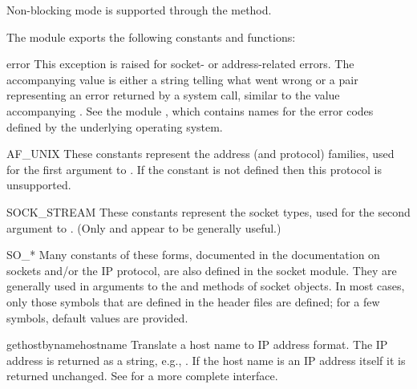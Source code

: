 Non-blocking mode is supported through the
 method.

The module  exports the following constants and functions:


\begin{excdesc}{error}
This exception is raised for socket- or address-related errors.
The accompanying value is either a string telling what went wrong or a
pair 
representing an error returned by a system
call, similar to the value accompanying .
See the module , which contains
names for the error codes defined by the underlying operating system.
\end{excdesc}

\begin{datadesc}{AF_UNIX}
These constants represent the address (and protocol) families,
used for the first argument to .  If the
 constant is not defined then this protocol is
unsupported.
\end{datadesc}

\begin{datadesc}{SOCK_STREAM}
These constants represent the socket types,
used for the second argument to .
(Only  and
 appear to be generally useful.)
\end{datadesc}

\begin{datadesc}{SO_*}
Many constants of these forms, documented in the \UNIX{} documentation on
sockets and/or the IP protocol, are also defined in the socket module.
They are generally used in arguments to the  and
 methods of socket objects.  In most cases, only
those symbols that are defined in the \UNIX{} header files are defined;
for a few symbols, default values are provided.
\end{datadesc}

\begin{funcdesc}{gethostbyname}{hostname}
Translate a host name to IP address format.  The IP address is
returned as a string, e.g.,  .  If the host name
is an IP address itself it is returned unchanged.  See
 for a more complete interface.
\end{funcdesc}

